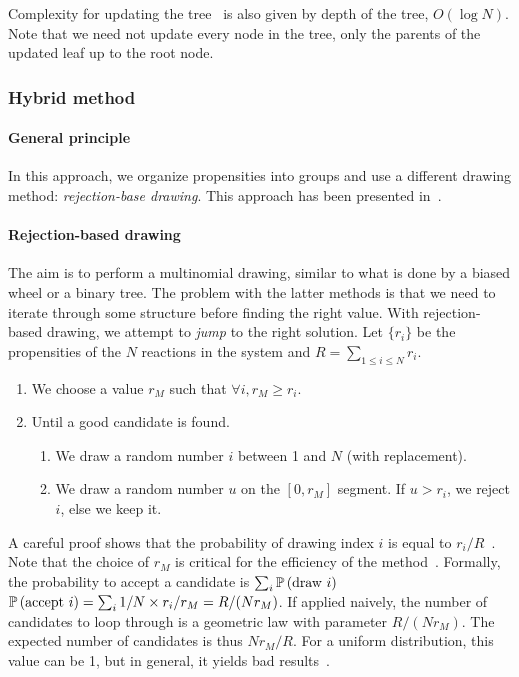 Complexity for updating the tree~ is also given by depth of the tree, $O(\log N)$.
Note that we need not update every node in the tree, only the parents of the updated leaf up to the root node.


\subsubsection{Hybrid method}

\paragraph{General principle}
In this approach, we organize propensities into groups and use a different drawing method: \emph{rejection-base drawing}.
This approach has been presented in~\citet{slepoy_constant-time_2008}.

\paragraph{Rejection-based drawing}
The aim is to perform a multinomial drawing, similar to what is done by a biased wheel or a binary tree.
The problem with the latter methods is that we need to iterate through some structure before finding the right value.
With rejection-based drawing, we attempt to \emph{jump} to the right solution.
Let $\{r_i\}$ be the propensities of the $N$ reactions in the system and $R = \sum_{1 \leq i \leq N} r_i$.
\begin{enumerate}
\item We choose a value $r_M$ such that $\forall i, r_M \geq r_i$.
\item Until a good candidate is found.
  \begin{enumerate}
  \item We draw a random number $i$ between 1 and $N$ (with replacement).
  \item We draw a random number $u$ on the $[0, r_M]$ segment. If $u > r_i$, we reject $i$, else we keep it.
  \end{enumerate}
\end{enumerate}

A careful proof shows that the probability of drawing index $i$ is equal to $r_i / R$~\citep{serebrinsky_physical_2011}.
Note that the choice of $r_M$ is critical for the efficiency of the method~.
Formally, the probability to accept a candidate is $\sum_i\mathbb{P}\left(\textrm{draw }i\right)$
$\mathbb{P}\left(\textrm{accept }i\right) = \sum_i1/N \times r_i/r_M = R/(Nr_M)$.
If applied naively, the number of candidates to loop through is a geometric law with parameter $R/(Nr_M)$.
The expected number of candidates is thus $Nr_M/R$.
For a uniform distribution, this value can be 1, but in general, it yields bad results~.

